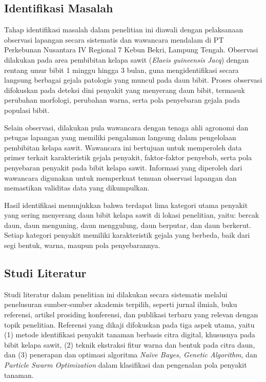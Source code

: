 \subsection{Identifikasi Masalah} \label{III.Identifikasi Masalah}
Tahap identifikasi masalah dalam penelitian ini diawali dengan pelaksanaan observasi lapangan secara sistematis dan wawancara mendalam di PT Perkebunan Nusantara IV Regional 7 Kebun Bekri, Lampung Tengah. Observasi dilakukan pada area pembibitan kelapa sawit (\textit{Elaeis guineensis Jacq}) dengan rentang umur bibit 1 minggu hingga 3 bulan, guna mengidentifikasi secara langsung berbagai gejala patologis yang muncul pada daun bibit. Proses observasi difokuskan pada deteksi dini penyakit yang menyerang daun bibit, termasuk perubahan morfologi, perubahan warna, serta pola penyebaran gejala pada populasi bibit.

Selain observasi, dilakukan pula wawancara dengan tenaga ahli agronomi dan petugas lapangan yang memiliki pengalaman langsung dalam pengelolaan pembibitan kelapa sawit. Wawancara ini bertujuan untuk memperoleh data primer terkait karakteristik gejala penyakit, faktor-faktor penyebab, serta pola penyebaran penyakit pada bibit kelapa sawit. Informasi yang diperoleh dari wawancara digunakan untuk memperkuat temuan observasi lapangan dan memastikan validitas data yang dikumpulkan.

Hasil identifikasi menunjukkan bahwa terdapat lima kategori utama penyakit yang sering menyerang daun bibit kelapa sawit di lokasi penelitian, yaitu: bercak daun, daun menguning, daun menggulung, daun berputar, dan daun berkerut. Setiap kategori penyakit memiliki karakteristik gejala yang berbeda, baik dari segi bentuk, warna, maupun pola penyebarannya. 

\subsection{Studi Literatur} \label{III.Studi Literatur}
Studi literatur dalam penelitian ini dilakukan secara sistematis melalui penelusuran sumber-sumber akademis terpilih, seperti jurnal ilmiah, buku referensi, artikel prosiding konferensi, dan publikasi terbaru yang relevan dengan topik penelitian. Referensi yang dikaji difokuskan pada tiga aspek utama, yaitu (1) metode identifikasi penyakit tanaman berbasis citra digital, khususnya pada bibit kelapa sawit, (2) teknik ekstraksi fitur warna dan bentuk pada citra daun, dan (3) penerapan dan optimasi algoritma \textit{Naïve Bayes, Genetic Algorithm}, dan \textit{Particle Swarm Optimization} dalam klasifikasi dan pengenalan pola penyakit tanaman.

